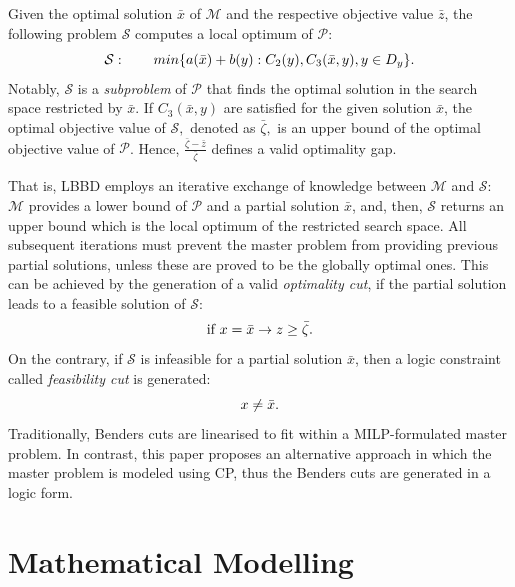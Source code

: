 \documentclass[a4paper,final]{article}
\begin{document}
        Given the optimal solution $\bar{x}$ of $\mathcal{M}$ and the respective objective value $\bar{z}$, the following problem $\mathcal{S}$ computes a local optimum of $\mathcal{P}$:
        \begin{equation}
            \mathcal{S}:\qquad min\{a(\bar{x}) + b(y):C_{2}(y), C_{3}(\bar{x}, y), y\in D_{y}\}. \notag 
        \end{equation}
        Notably, $\mathcal{S}$ is a \emph{subproblem} of $\mathcal{P}$ that finds the optimal solution in the search space restricted by $\bar{x}$. If $C_{3}(\bar{x}, y)$ are satisfied for the given solution $\bar{x}$, the optimal objective value of $\mathcal{S},$ denoted as $\bar{\zeta},$ is an upper bound of the optimal objective value of $\mathcal{P}$. Hence, $\frac{\bar{\zeta} - \bar{z}}{\bar{\zeta}}$ defines a valid optimality gap.
        
        That is, LBBD employs an iterative exchange of knowledge between $\mathcal{M}$ and $\mathcal{S}$: $\mathcal{M}$ provides a lower bound of $\mathcal{P}$ and a partial solution $\bar{x}$, and, then, $\mathcal{S}$ returns an upper bound which is the local optimum of the restricted search space. All subsequent iterations must prevent the master problem from providing previous partial solutions, unless these are proved to be the globally optimal ones. This can be achieved by the generation of a valid \emph{optimality cut}, if the partial solution leads to a feasible solution of $\mathcal{S}$:
        \begin{equation}
            \text{if }x = \bar{x} \rightarrow z\geq \bar{\zeta}. \notag
        \end{equation}
        On the contrary, if $\mathcal{S}$ is infeasible for a partial solution $\bar{x}$, then a logic constraint called \emph{feasibility cut} is generated:
        \begin{equation}
            x \neq \bar{x}.\notag
        \end{equation}
        Traditionally, Benders cuts are linearised to fit within a MILP-formulated master problem. In contrast, this paper proposes an alternative approach in which the master problem is modeled using CP, thus the Benders cuts are generated in a logic form.
\section{Mathematical Modelling} \label{sec:model}
\end{document}

